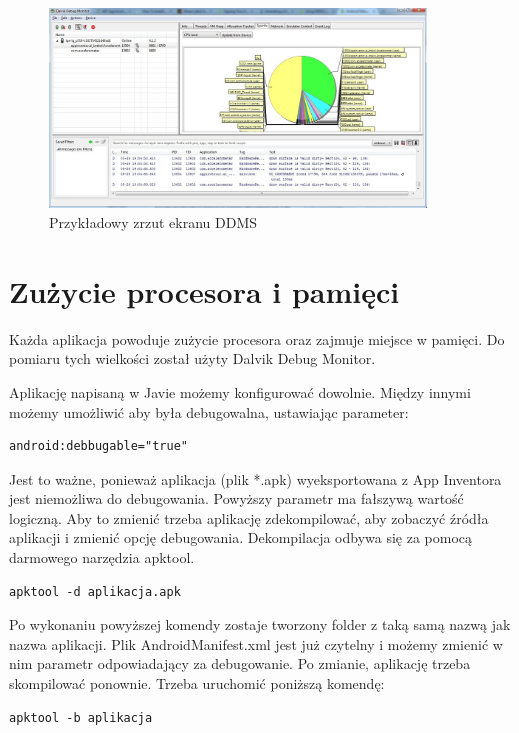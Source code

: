 \begin{figure}[th] 
\centering\includegraphics[width=10cm]{figures/dalvik}
\caption{Przykładowy zrzut ekranu DDMS}
\end{figure}

\section{Zużycie procesora i pamięci}

Każda aplikacja powoduje zużycie procesora oraz zajmuje miejsce w pamięci. Do pomiaru tych wielkości został użyty Dalvik Debug Monitor.

Aplikację napisaną w Javie możemy konfigurować dowolnie. Między innymi możemy umożliwić aby była debugowalna, ustawiając parameter:

\begin{lstlisting}
android:debbugable="true"
\end{lstlisting}

Jest to ważne, ponieważ aplikacja (plik *.apk) wyeksportowana z App Inventora jest niemożliwa do debugowania. Powyższy parametr ma fałszywą wartość logiczną. Aby to zmienić trzeba aplikację zdekompilować, aby zobaczyć źródła aplikacji i zmienić opcję debugowania. Dekompilacja odbywa się za pomocą darmowego narzędzia apktool.

\begin{lstlisting}
apktool -d aplikacja.apk
\end{lstlisting}

Po wykonaniu powyższej komendy zostaje tworzony folder z taką samą nazwą jak nazwa aplikacji. Plik AndroidManifest.xml jest już czytelny i możemy zmienić w nim parametr odpowiadający za debugowanie. Po zmianie, aplikację trzeba skompilować ponownie. Trzeba uruchomić poniższą komendę:

\begin{lstlisting}
apktool -b aplikacja
\end{lstlisting}

